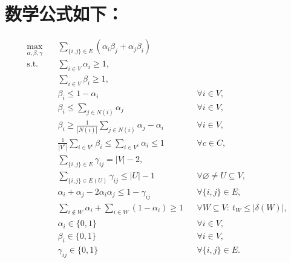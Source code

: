 \documentclass{article}
\begin{document}
\section*{数学公式如下：}
\begin{align}
\max_{\alpha,\beta,\gamma}\quad
&\sum_{\{i,j\}\in E}\left(\alpha_i\beta_j+\alpha_j\beta_i\right) \\[-1mm]
\text{s.t.}\quad
&\sum_{i\in V}\alpha_i\ge 1, \label{eq:nonempty-alpha}\\
&\sum_{i\in V}\beta_i\ge 1, \label{eq:nonempty-beta}\\
&\beta_i\le 1-\alpha_i &&\forall i\in V, \label{eq:beta-disjoint}\\
&\beta_i\le \sum_{j\in N(i)}\alpha_j &&\forall i\in V, \label{eq:beta-adjacent}\\
&\beta_i\ge \frac{1}{|N(i)|}\sum_{j\in N(i)}\alpha_j-\alpha_i &&\forall i\in V, \label{eq:beta-forced}\\
&\frac{1}{|V^c|}\sum_{i\in V^c}\beta_i
  \le \sum_{i\in V^c}\alpha_i\le 1 &&\forall c\in C, \label{eq:color}\\
&\sum_{\{i,j\}\in E}\gamma_{ij}=|V|-2, \label{eq:tree-count}\\
&\sum_{\{i,j\}\in E(U)}\gamma_{ij}\le |U|-1 &&\forall \varnothing\ne U\subseteq V, \label{eq:acyclicity}\\
&\alpha_i+\alpha_j-2\alpha_i\alpha_j\le 1-\gamma_{ij}
 &&\forall\{i,j\}\in E, \label{eq:same-component}\\
&\sum_{i\notin W}\alpha_i+\sum_{i\in W}(1-\alpha_i)\ge 1
 &&\forall W\subseteq V:\ t_W\le |\delta(W)|, \label{eq:nogood}\\
&\alpha_i\in\{0,1\} &&\forall i\in V, \label{eq:alpha-domain}\\
&\beta_i\in\{0,1\} &&\forall i\in V, \label{eq:beta-domain}\\
&\gamma_{ij}\in\{0,1\} &&\forall\{i,j\}\in E. \label{eq:gamma-domain}
\end{align}
\end{document}
